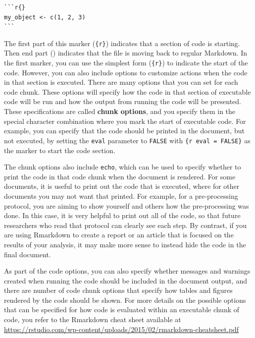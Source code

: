 \documentclass[]{tufte-book}
\begin{document}
\begin{verbatim}
```r{}
my_object <- c(1, 2, 3)
```
\end{verbatim}

The first part of this marker (\texttt{\textasciigrave{}\textasciigrave{}\textasciigrave{}\{r\}}) indicates that a section of
code is starting. Then end part (\texttt{\textasciigrave{}\textasciigrave{}\textasciigrave{}}) indicates that the file is
moving back to regular Markdown. In the first marker, you can use the simplest
form (\texttt{\textasciigrave{}\textasciigrave{}\textasciigrave{}\{r\}}) to indicate the start of the code. However, you can also
include options to customize actions when the code in that section is executed.
There are many options that you can set for each code chunk. These options will
specify how the code in that section of executable code will be run and how the
output from running the code will be presented. These specifications are called
\textbf{chunk options}, and you specify them in the special character combination
where you mark the start of executable code. For example, you can specify that
the code should be printed in the document, but not executed, by setting the
\texttt{eval} parameter to \texttt{FALSE} with \texttt{\textasciigrave{}\textasciigrave{}\textasciigrave{}\{r\ eval\ =\ FALSE\}} as the marker to
start the code section.

The chunk options also include \texttt{echo}, which can be used to specify whether to
print the code in that code chunk when the document is rendered. For some
documents, it is useful to print out the code that is executed, where for other
documents you may not want that printed. For example, for a pre-processing
protocol, you are aiming to show yourself and others how the pre-processing was
done. In this case, it is very helpful to print out all of the code, so that
future researchers who read that protocol can clearly see each step. By
contrast, if you are using Rmarkdown to create a report or an article that is
focused on the results of your analysis, it may make more sense to instead hide
the code in the final document.

As part of the code options, you can also specify whether messages and warnings
created when running the code should be included in the document output, and
there are number of code chunk options that specify how tables and figures
rendered by the code should be shown. For more details on the possible options
that can be specified for how code is evaluated within an executable chunk of
code, you refer to the Rmarkdown cheat sheet available at
\url{https://rstudio.com/wp-content/uploads/2015/02/rmarkdown-cheatsheet.pdf}
\end{document}
